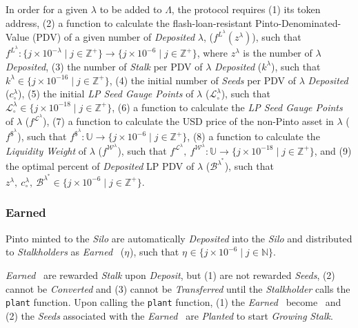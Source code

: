 \documentclass[tikz]{article}
\newcommand{\code}[1]{\texttt{#1}}
\newcommand{\term}[1]{\textsl{#1}}
\newcommand{\Pinto}{} %
\newcommand{\pinto}{} %
\begin{document}
In order for a given $\lambda$ to be added to $\Lambda$, the protocol requires 
(1) its token address, 
(2) a function to calculate the flash-loan-resistant Pinto-Denominated-Value (PDV) of a given number of \term{Deposited} $\lambda$, ($f^{L^{\lambda}}(z^{\lambda})$), such that $f^{L^{\lambda}}\colon \{j \times 10^{-\lambda} \mid j \in \mathbb{Z}^{+} \} \rightarrow \{j \times 10^{-6} \mid j \in \mathbb{Z}^{+} \}$, where $z^{\lambda}$ is the number of $\lambda$ \term{Deposited}, 
(3) the number of \term{Stalk} per PDV of $\lambda$ \term{Deposited} ($k^{\lambda}$), such that $k^{\lambda} \in \{j \times 10^{-16} \mid j \in \mathbb{Z}^{+} \}$, 
(4) the initial number of \term{Seeds} per PDV of $\lambda$ \term{Deposited} ($c_{\circ}^{\lambda}$),
(5) the initial \term{LP Seed Gauge Points} of $\lambda$ ($\mathscr{L}_{\circ}^{\lambda}$), such that $\mathscr{L}_{\circ}^{\lambda} \in \{j \times 10^{-18} \mid j \in \mathbb{Z}^{+} \}$,
(6) a function to calculate the \term{LP Seed Gauge Points} of $\lambda$ ($f^{\mathscr{L}^{\lambda}}$), 
(7) a function to calculate the USD price of the non-Pinto asset in $\lambda$ ($f^{\$^{\lambda}}$), such that $f^{\$^{\lambda}} \colon \mathbb{U} \rightarrow \{j \times 10^{-6} \mid j \in \mathbb{Z}^{+} \}$,
(8) a function to calculate the \term{Liquidity Weight} of $\lambda$ ($f^{\mathscr{W}^{\lambda}}$), such that $f^{\mathscr{L}^{\lambda}},\ f^{\mathscr{W}^{\lambda}} \colon \mathbb{U} \rightarrow \{j \times 10^{-18} \mid j \in \mathbb{Z}^{+} \}$, and
(9) the optimal percent of \term{Deposited} LP PDV of $\lambda$ ($\mathscr{B}^{\lambda^{*}}$), such that $z^{\lambda},\ c_{\circ}^{\lambda},\ \mathscr{B}^{\lambda^{*}} \in \{j \times 10^{-6} \mid j \in \mathbb{Z}^{+} \}$.


\subsubsection{Earned \Pinto}

Pinto minted to the \term{Silo} are automatically \term{Deposited} into the \term{Silo} and distributed to \term{Stalkholders} as \term{Earned} \Pinto\ ($\eta^{\pinto}$), such that $\eta^{\pinto} \in \{j \times 10^{-6} \mid j \in \mathbb{N} \}$.

\term{Earned} \Pinto\ are rewarded \term{Stalk} upon \term{Deposit}, but (1) are not rewarded \term{Seeds}, (2) cannot be \term{Converted} and (3) cannot be \term{Transferred} until the \term{Stalkholder} calls the \code{plant} function. Upon calling the \code{plant} function, (1)  the \term{Earned} \Pinto\ become \Pinto\ and (2) the \term{Seeds} associated with the \term{Earned} \Pinto\ are \term{Planted} to start \term{Growing} \term{Stalk}. 
\end{document}
